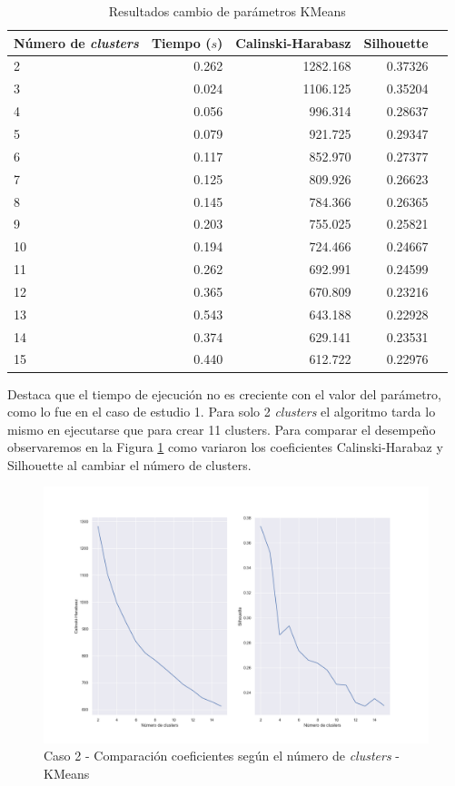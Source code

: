 \documentclass[a4paper, 20pt]{article}
\begin{document}
\begin{table}[H]
\centering
\caption{Resultados cambio de parámetros KMeans}
\label{tab:param_kmeans2}
\begin{tabular}{lrrrr}
\toprule
Número de \textit{clusters} & Tiempo ($s$) & Calinski-Harabasz & Silhouette &\\
\midrule
2 & 0.262 & 1282.168 & 0.37326 \\
3 & 0.024 & 1106.125 & 0.35204 \\
4 & 0.056 & 996.314 & 0.28637 \\
5 & 0.079 & 921.725 & 0.29347 \\
6 & 0.117 & 852.970 & 0.27377 \\
7 & 0.125 & 809.926 & 0.26623 \\
8 & 0.145 & 784.366 & 0.26365 \\
9 & 0.203 & 755.025 & 0.25821 \\
10 & 0.194 & 724.466 & 0.24667 \\
11 & 0.262 & 692.991 & 0.24599 \\
12 & 0.365 & 670.809 & 0.23216 \\
13 & 0.543 & 643.188 & 0.22928 \\
14 & 0.374 & 629.141 & 0.23531 \\
15 & 0.440 & 612.722 & 0.22976 \\
\bottomrule
\end{tabular}
\end{table}

Destaca que el tiempo de ejecución no es creciente con el valor del parámetro, como lo fue en el caso de estudio 1. Para solo 2 \textit{clusters} el algoritmo tarda lo mismo en ejecutarse que para crear 11 clusters. Para comparar el desempeño observaremos en la Figura  \ref{fig:param_kmeans2} como variaron los coeficientes Calinski-Harabaz y Silhouette al cambiar el número de clusters.

\begin{figure}[H]
    \centering
    \includegraphics[width=1.2\textwidth, height=0.45\textheight]{./caso2/param_kmeans}
    \caption{Caso 2 - Comparación coeficientes según el número de \textit{clusters} - KMeans}
    \label{fig:param_kmeans2}
\end{figure}
\end{document}
